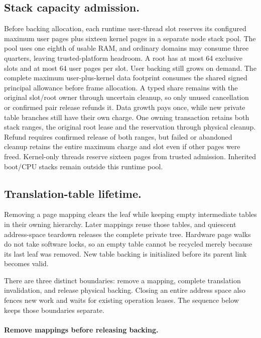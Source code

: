 \subsection{Stack capacity admission.}
Before backing allocation, each runtime user-thread slot reserves its configured
maximum user pages plus sixteen kernel pages in a separate node stack pool.
The pool uses one eighth of usable RAM, and ordinary domains may consume three
quarters, leaving trusted-platform headroom. A root has at most 64 exclusive
slots and at most 64 user pages per slot. User backing still grows on demand.
The complete maximum user-plus-kernel data footprint consumes the shared signed
principal allowance before frame allocation. A typed share remains with the
original slot/root owner through uncertain cleanup, so only unused cancellation or
confirmed pair release refunds it. Data growth pays once, while new private
table branches still have their own charge.
One owning transaction retains both stack ranges, the original root lease and
the reservation through physical cleanup. Refund requires confirmed release of
both ranges, but failed or abandoned cleanup retains the entire maximum charge and
slot even if other pages were freed. Kernel-only threads reserve sixteen pages
from trusted admission. Inherited boot/CPU stacks remain outside this runtime pool.

\subsection{Translation-table lifetime.}

Removing a page mapping clears the leaf while keeping empty intermediate
tables in their owning hierarchy. Later mappings reuse those tables, and
quiescent address-space teardown releases the complete private tree. Hardware
page walks do not take software locks, so an empty table cannot be recycled
merely because its last leaf was removed. New table backing is initialized
before its parent link becomes valid.

There are three distinct boundaries: remove a mapping, complete translation
invalidation, and release physical backing. Closing an entire address space
also fences new work and waits for existing operation leases. The sequence
below keeps those boundaries separate.

\paragraph*{Remove mappings before releasing backing.}

